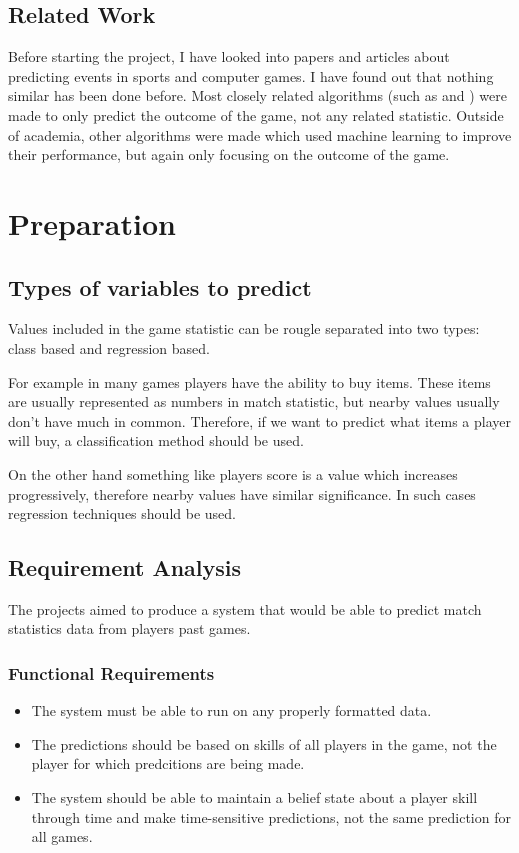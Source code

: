 \documentclass[12pt,a4paper]{book}
\begin{document}
\section{Related Work}
Before starting the project, I have looked into papers and articles about predicting events in sports and computer games.
I have found out that nothing similar has been done before.
Most closely related algorithms (such as \cite{trueskill} and \cite{bayesianranking}) were made to only predict the outcome of the game, not any related statistic.
Outside of academia, other algorithms were made which used machine learning to improve their performance, but again only focusing on the outcome of the game.


\chapter{Preparation}
\section{Types of variables to predict}
Values included in the game statistic can be rougle separated into two types: class based and regression based.

For example in many games players have the ability to buy items.
These items are usually represented as numbers in match statistic, but nearby values usually don't have much in common.
Therefore, if we want to predict what items a player will buy, a classification method should be used.

On the other hand something like players score is a value which increases progressively, therefore nearby values have similar significance.
In such cases regression techniques should be used.
\section{Requirement Analysis}
The projects aimed to produce a system that would be able to predict match statistics data from players past games.
\subsection{Functional Requirements}
\begin{itemize}
\item The system must be able to run on any properly formatted data.
\item The predictions should be based on skills of all players in the game, not the player for which predcitions are being made.
\item The system should be able to maintain a belief state about a player skill through time and make time-sensitive predictions, not the same prediction for all games. %
\end{itemize}
\end{document}
